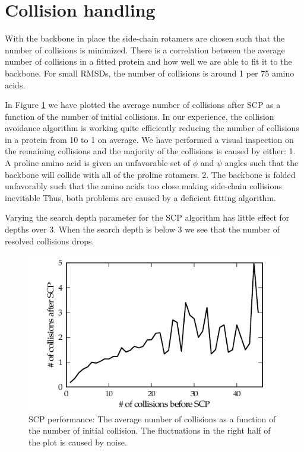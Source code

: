 \section{Collision handling}
With the backbone in place the side-chain rotamers are chosen such that the number of collisions is minimized.
There is a correlation between the average number of collisions in a fitted protein and how well we are able to fit it to the backbone. 
For small RMSDs, the number of collisions is around 1 per 75 amino acids.

In Figure \ref{fig:plot_scp} we have plotted the average number of collisions after SCP as a function of the number of initial collisions.
In our experience, the collision avoidance algorithm is working quite efficiently reducing the number of collisions in a protein from 10 to 1 on average.
We have performed a visual inspection on the remaining collisions and the majority of the collisions is caused by either: 
1. A proline amino acid is given an unfavorable set of $\phi$ and $\psi$ angles such that the backbone will collide with all of the proline rotamers.
2. The backbone is folded unfavorably such that the amino acids too close making side-chain collisions inevitable
Thus, both problems are caused by a deficient fitting algorithm.

Varying the search depth parameter for the SCP algorithm has little effect for depths over 3.
When the search depth is below 3 we see that the number of resolved collisions drops.

\label{sec:evaluation_handling_side-chains}
\begin{figure}
	\centering
	\hspace*{-3.5mm}\includegraphics[width=1.1\columnwidth]{figures/plot_scp}
	\caption{SCP performance: The average number of collisions as a function of the number of initial collision. The fluctuations in the right half of the plot is caused by noise.}
	\label{fig:plot_scp}
\end{figure}


